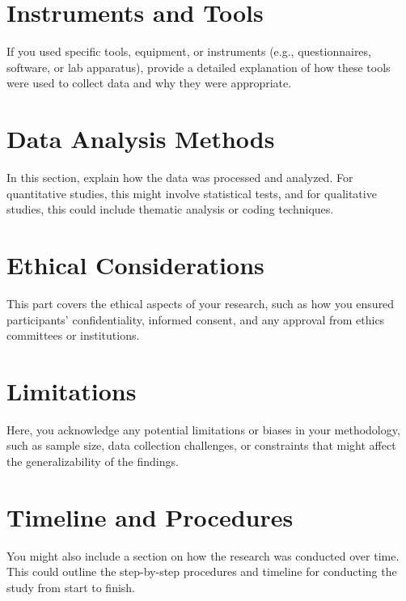 \section{Instruments and Tools}
If you used specific tools, equipment, or instruments (e.g., questionnaires, software, or lab apparatus), provide a detailed explanation of how these tools were used to collect data and why they were appropriate.


\section{Data Analysis Methods}
In this section, explain how the data was processed and analyzed. For quantitative studies, this might involve statistical tests, and for qualitative studies, this could include thematic analysis or coding techniques.


\section{Ethical Considerations}
This part covers the ethical aspects of your research, such as how you ensured participants’ confidentiality, informed consent, and any approval from ethics committees or institutions.


\section{Limitations}
Here, you acknowledge any potential limitations or biases in your methodology, such as sample size, data collection challenges, or constraints that might affect the generalizability of the findings.


\section{Timeline and Procedures}
You might also include a section on how the research was conducted over time. This could outline the step-by-step procedures and timeline for conducting the study from start to finish.
